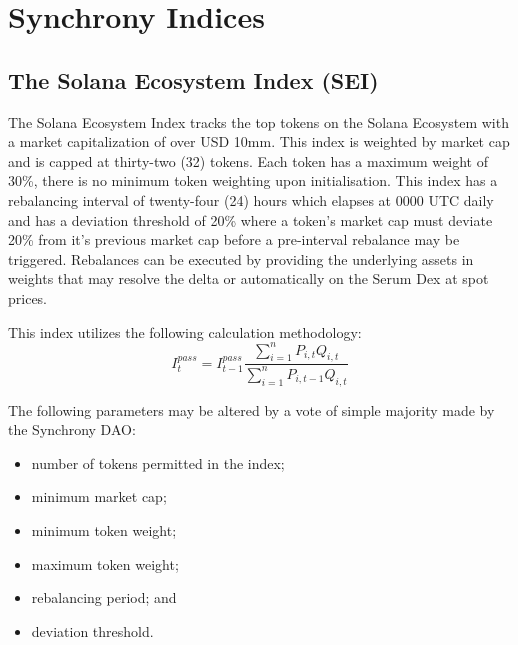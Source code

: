\documentclass[10pt]{article}
\begin{document}
					\section{Synchrony Indices}
					\subsection{The Solana Ecosystem Index (SEI)}
					The Solana Ecosystem Index tracks the top tokens on the Solana Ecosystem with
					a market capitalization of over USD 10mm. This index is weighted by market cap
					and is capped at thirty-two (32) tokens. Each token has a maximum weight of
					30\%, there is no minimum token weighting upon initialisation. This index has
					a rebalancing interval of twenty-four (24) hours which elapses at 0000 UTC daily
					and has a deviation threshold of 20\% where a token's market cap must deviate
					20\% from it's previous market cap before a pre-interval rebalance may be
					triggered. Rebalances can be executed by providing the underlying assets in
					weights that may resolve the delta or automatically on the Serum Dex at spot
					prices.

					This index utilizes the following calculation methodology:
					\[I^{pass}_t = I^{pass}_{t-1}\frac{\sum_{i=1}^n P_{i,t}Q_{i,t}}{\sum_{i=1}^n
					P_{i,t-1}Q_{i,t}}\]

					The following parameters may be altered by a vote of simple majority made by the
					Synchrony DAO:
					\begin{itemize}
						\item number of tokens permitted in the index;
						\item minimum market cap;
						\item minimum token weight;
						\item maximum token weight;
						\item rebalancing period; and
						\item deviation threshold.
					\end{itemize}
\end{document}
